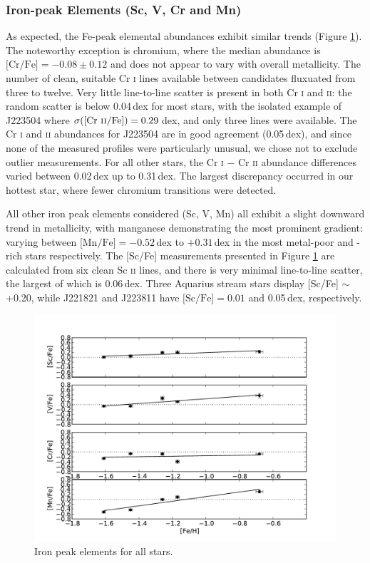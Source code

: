 \documentclass{emulateapj}
\begin{document}
\subsubsection{Iron-peak Elements (Sc, V, Cr and Mn)}

As expected, the Fe-peak elemental abundances exhibit similar trends (Figure \ref{fig:fe-peak-elements}). The noteworthy exception is chromium, where the median abundance is $\mbox{[Cr/Fe]} = -0.08 \pm 0.12$ and does not appear to vary with overall metallicity. The number of clean, suitable Cr \textsc{i} lines available between candidates fluxuated from three to twelve. Very little line-to-line scatter is present in both Cr \textsc{i} and \textsc{ii}: the random scatter is below 0.04\,dex for most stars, with the isolated example of J223504 where $\sigma(\mbox{[Cr \textsc{ii}/Fe]}) = 0.29$\,dex, and only three lines were available. The Cr \textsc{i} and \textsc{ii} abundances for J223504 are in good agreement (0.05\,dex), and since none of the measured profiles were particularly unusual, we chose not to exclude outlier measurements. For all other stars, the Cr \textsc{i} $-$ Cr \textsc{ii} abundance differences varied between 0.02\,dex up to 0.31\,dex. The largest discrepancy occurred in our hottest star, where fewer chromium transitions were detected.

All other iron peak elements considered (Sc, V, Mn) all exhibit a slight downward trend in metallicity, with manganese demonstrating the most prominent gradient: varying between $\mbox{[Mn/Fe]} = -0.52$\,dex to $+0.31$\,dex in the most metal-poor and -rich stars respectively. The [Sc/Fe] measurements presented in Figure \ref{fig:fe-peak-elements} are calculated from six clean Sc \textsc{ii} lines, and there is very minimal line-to-line scatter, the largest of which is 0.06\,dex. Three Aquarius stream stars display [Sc/Fe] $\sim$ +0.20, while J221821 and J223811 have $\mbox{[Sc/Fe]} = 0.01$ and 0.05\,dex, respectively.

\begin{figure}[h]
	\includegraphics[width=\columnwidth]{./figures/aquarius-fe-peak.pdf}
	\caption{Iron peak elements for all stars.}
	\label{fig:fe-peak-elements}
\end{figure}
\end{document}
